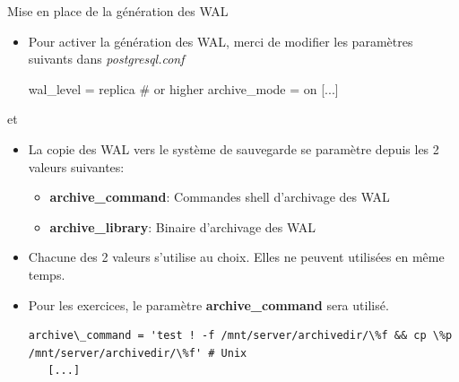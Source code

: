 
\begin{frame}[fragile]{Mise en place de la génération des WAL}

\begin{itemize}

   \item Pour activer la génération des WAL, merci de modifier les paramètres suivants dans \textit{postgresql.conf}

\begin{intercom}
wal\_level = replica # or higher
archive\_mode = on
[...]
\end{intercom}

\end{itemize}

\begin{toile}
\end{toile}

\end{frame}


\begin{frame}[fragile]{ et }

\begin{itemize}

   \item La copie des WAL vers le système de sauvegarde se paramètre depuis les 2 valeurs suivantes:

   \begin{itemize}
      \item \textbf{archive\_command}: Commandes shell d'archivage des WAL
      \item \textbf{archive\_library}: Binaire d'archivage des WAL
   \end{itemize}

   \item Chacune des 2 valeurs s'utilise au choix. Elles ne peuvent utilisées en même temps.
   \item Pour les exercices, le paramètre \textbf{archive\_command} sera utilisé.

\begin{tiny}
\begin{Verbatim}[commandchars=\\\{\}]
archive\_command = 'test ! -f /mnt/server/archivedir/\%f && cp \%p /mnt/server/archivedir/\%f' # Unix
   [...]
\end{Verbatim}
\end{tiny}

\end{itemize}

\end{frame}

